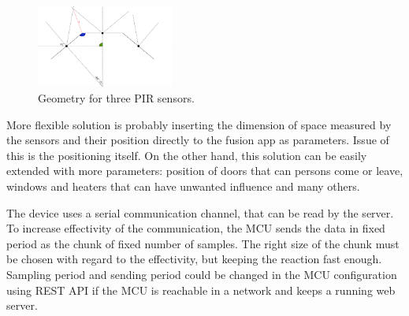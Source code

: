 \begin{figure}[h!]
\begin{center}
\includegraphics[width=0.4\textwidth]{img/3pir_geometry.png}
\caption{Geometry for three PIR sensors.\label{fig:3pir_geometry}}
\end{center}
\end{figure}

More flexible solution is probably inserting the dimension of space measured by the sensors
and their position directly to the fusion app as parameters. Issue of this is the positioning
itself. On the other hand, this solution can be easily extended with more parameters:
position of doors that can persons come or leave, windows and heaters that can have
unwanted influence and many others.

The device uses a serial communication channel, that can be read by the server. To
increase effectivity of the communication, the MCU sends the data in fixed period
as the chunk of fixed number of samples. The right size of the chunk must be chosen
with regard to the effectivity, but keeping the reaction fast enough. Sampling period and
sending period could be changed in the MCU configuration using REST API if the MCU
is reachable in a network and keeps a running web server.







